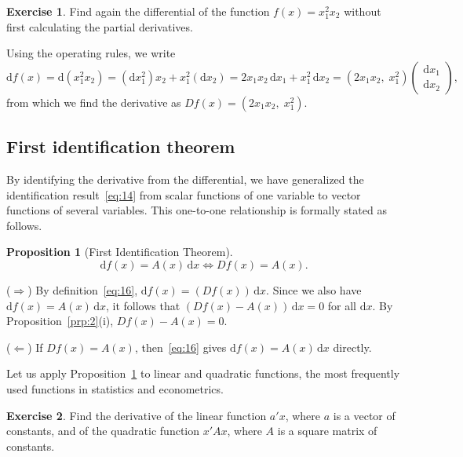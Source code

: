 \documentclass[12pt,a4paper]{article}
\makeatletter
\theoremstyle{definition}
\newtheorem{proposition}{Proposition}
\newtheorem{exercise}{Exercise}
\renewenvironment{proof}[1][\proofname]{\par
  \pushQED{\qed}%
  \normalfont \topsep6\p@\@plus6\p@\relax
  \trivlist
  \item[\hskip\labelsep\bfseries #1\@addpunct{.}]\ignorespaces
}{%
  \popQED\endtrivlist\@endpefalse
}
\newenvironment{solution}{%
  \begin{proof}[Solution]%
}{%
  \end{proof}%
}
\newcommand{\dd}{\mathrm{d}}
\makeatother
\begin{document}
\begin{exercise}\label{exer:10}
Find again the differential of the function $f(x) = x_1^2 x_2$ without first calculating the partial derivatives.
\end{exercise}

\begin{solution}
Using the operating rules, we write
\[
\dd f(x) = \dd(x_1^2 x_2) = (\dd x_1^2) x_2 + x_1^2 (\dd x_2)
= 2x_1 x_2\, \dd x_1 + x_1^2\, \dd x_2
= (2x_1 x_2,\; x_1^2) \begin{pmatrix} \dd x_1 \\ \dd x_2 \end{pmatrix},
\]
from which we find the derivative as $Df(x) = (2x_1 x_2,\; x_1^2)$. %
\end{solution}

\subsection{First identification theorem}\label{sec:4.4}

By identifying the derivative from the differential, we have generalized the identification result~\eqref{eq:14} from scalar functions of one variable to vector functions of several variables. This one-to-one relationship is formally stated as follows. %

\begin{proposition}[First Identification Theorem]\label{prp:11}
\[
\dd f(x) = A(x)\, \dd x \iff Df(x) = A(x).
\]
\end{proposition}

\begin{proof}
($\Rightarrow$) By definition~\eqref{eq:16}, $\dd f(x) = (Df(x))\, \dd x$. Since we also have $\dd f(x) = A(x)\, \dd x$, it follows that $(Df(x) - A(x))\, \dd x = 0$ for all $\dd x$. By Proposition~\ref{prp:2}(i), $Df(x) - A(x) = 0$.

($\Leftarrow$) If $Df(x) = A(x)$, then~\eqref{eq:16} gives $\dd f(x) = A(x)\, \dd x$ directly.
\end{proof}

Let us apply Proposition~\ref{prp:11} to linear and quadratic functions, the most frequently used functions in statistics and econometrics. %

\begin{exercise}\label{exer:11}
Find the derivative of the linear function $a'x$, where $a$ is a vector of constants, and of the quadratic function $x'Ax$, where $A$ is a square matrix of constants.
\end{exercise}
\end{document}
